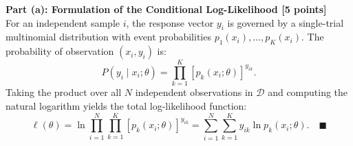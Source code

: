 \documentclass[11pt,a4paper]{article}
\begin{document}
\vspace{8pt}
\noindent{\large\bfseries\textcolor{utblue}{Solution:}}
\vspace{4pt}

\textbf{Part (a): Formulation of the Conditional Log-Likelihood [5 points]} \\
For an independent sample $i$, the response vector $y_i$ is governed by a single-trial multinomial distribution with event probabilities $p_1(x_i), \dots, p_K(x_i)$. The probability of observation $(x_i, y_i)$ is:
\[
  P(y_i \mid x_i; \theta) = \prod_{k=1}^K [p_k(x_i; \theta)]^{y_{ik}}.
\]
Taking the product over all $N$ independent observations in $\mathcal{D}$ and computing the natural logarithm yields the total log-likelihood function:
\[
  \ell(\theta) = \ln \prod_{i=1}^N \prod_{k=1}^K [p_k(x_i; \theta)]^{y_{ik}} = \sum_{i=1}^N \sum_{k=1}^K y_{ik} \ln p_k(x_i; \theta). \quad \blacksquare
\]
\end{document}
